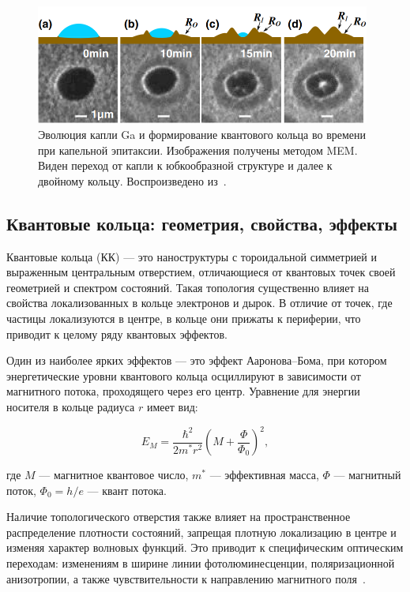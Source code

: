 \documentclass[14pt,oneside]{extarticle}
\begin{document}
\begin{figure}
    \begin{center}
        \includegraphics[width=11cm]{images/Zhou1-Firgure1.png}
        \caption{\label{fig:zhou1}
            Эволюция капли Ga и формирование квантового кольца во времени при капельной эпитаксии. Изображения получены методом MEM. Виден переход от капли к юбкообразной структуре и далее к двойному кольцу. Воспроизведено из~\cite{zhou2013}.}
    \end{center}
\end{figure}

\subsection{Квантовые кольца: геометрия, свойства, эффекты}

Квантовые кольца (КК) — это наноструктуры с тороидальной симметрией и выраженным центральным отверстием, отличающиеся от квантовых точек своей геометрией и спектром состояний. Такая топология существенно влияет на свойства локализованных в кольце электронов и дырок. В отличие от точек, где частицы локализуются в центре, в кольце они прижаты к периферии, что приводит к целому ряду квантовых эффектов.

Один из наиболее ярких эффектов — это эффект Ааронова–Бома, при котором энергетические уровни квантового кольца осциллируют в зависимости от магнитного потока, проходящего через его центр. Уравнение для энергии носителя в кольце радиуса $r$ имеет вид:

\[
E_M = \frac{\hbar^2}{2m^* r^2} \left( M + \frac{\Phi}{\Phi_0} \right)^2,
\]

где $M$ — магнитное квантовое число, $m^*$ — эффективная масса, $\Phi$ — магнитный поток, $\Phi_0 = h/e$ — квант потока.

Наличие топологического отверстия также влияет на пространственное распределение плотности состояний, запрещая плотную локализацию в центре и изменяя характер волновых функций. Это приводит к специфическим оптическим переходам: изменениям в ширине линии фотолюминесценции, поляризационной анизотропии, а также чувствительности к направлению магнитного поля~\cite{Beo2020}.
\end{document}
